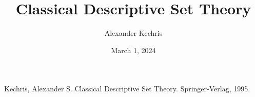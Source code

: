 \documentclass[a4paper]{article}
\title{Classical Descriptive Set Theory}
\date{March 1, 2024}
\author{Alexander Kechris}
\begin{document}
\maketitle
\par{Kechris, Alexander S. Classical Descriptive Set Theory. Springer-Verlag, 1995.}
\printbibliography
\end{document}
